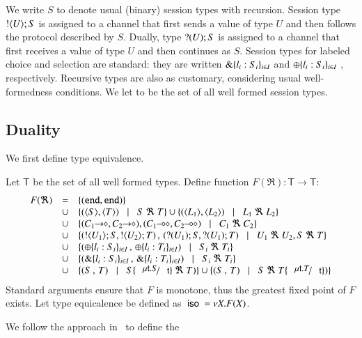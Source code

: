 We write $S$ to denote usual (binary) session types with recursion. 
Session type $! \langle U \rangle ; S$ is assigned to a channel that first sends a 
value of type $U$ and then follows
the protocol described by $S$.
Dually, type $? (U) ; S$ is assigned to a channel  
that first receives a value of type $U$ and then continues as $S$. 
Session types for labeled choice and selection are standard: they are 
written $\& \{l_i:S_i\}_{i \in I}$ and $\oplus \{l_i:S_i\}_{i \in I}$ , respectively. 
Recursive types are also as customary, considering usual 
well-formedness conditions. We let \ST to be the set of
all well formed session types.

\subsection{Duality}
We first define type equivalence.
%
\begin{definition}\rm
\label{def:type_equiv}
	Let $\mathsf{T}$ be the set of all well formed types.
	Define function $F(\Re): \mathsf{T} \longrightarrow \mathsf{T}$:
	\[
		\begin{array}{rcl}
			F(\Re) 	&=&	\set{(\tinact, \tinact)} \\
				&\cup&	\set{(\chtype{S}, \chtype{T}) \bnfbar S\ \Re\ T} \cup \set{(\chtype{L_1}, \chtype{L_2}) \bnfbar L_1\ \Re\ L_2}\\
				&\cup&	\set{(\shot{C_1}, \shot{C_2}), (\lhot{C_1}, \lhot{C_2}) \bnfbar C_1\ \Re\ C_2}\\
				&\cup&	\set{(\btout{U_1} S, \btout{U_2} T)\,,\, (\btinp{U_1} S, \btinp{U_1} T) \bnfbar U_1\ \Re\ U_2, S\ \Re\ T}\\
				&\cup&	\set{(\btsel{l_i: S_i}_{i \in I} \,,\, \btsel{l_i: T_i}_{i \in I}) \bnfbar  S_i\ \Re\ T_i}\\
				&\cup&	\set{(\btbra{l_i: S_i}_{i \in I}\,,\, \btbra{l_i: T_i}_{i \in I}) \bnfbar S_i\ \Re\ T_i}\\
				&\cup&	\set{(S\,,\, T) \bnfbar S\subst{\trec{t}{S}}{\vart{t}}\ \Re\ T)}
				\cup	\set{(S\,,\, T) \bnfbar S\ \Re\ T\subst{\trec{t}{T}}{\vart{t}})}
		\end{array}
	\]	
	\noi Standard arguments ensure that $F$ is monotone, thus the greatest fixed point
	of $F$ exists. Let type equicalence be defined as $\ \mathsf{iso}\  = \nu X. F(X)$.
\end{definition}
%
We follow the approach in~\cite{onSessionDualityBDGK} to define the 
